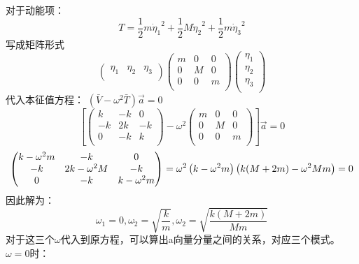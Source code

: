 \documentclass[UTF8,10pt]{article}
\begin{document}
对于动能项：
$$
    T=\frac{1}{2}{m\dot{\eta}_1}^2+\frac{1}{2}{M\dot{\eta}_2}^2+\frac{1}{2}{m\dot{\eta}_3}^2
$$
写成矩阵形式
$$
    \left( \begin{matrix}
            \eta _1 & \eta _2 & \eta _3 \\
        \end{matrix} \right) \left( \begin{matrix}
            m & 0 & 0 \\
            0 & M & 0 \\
            0 & 0 & m \\
        \end{matrix} \right) \left( \begin{array}{c}
            \eta _1 \\
            \eta _2 \\
            \eta _3 \\
        \end{array} \right)
$$
代入本征值方程：
$(\bar{V}-\omega ^2 \bar{T})\vec{a}=0$
$$
    \left[ \left( \begin{matrix}
            k  & -k & 0  \\
            -k & 2k & -k \\
            0  & -k & k  \\
        \end{matrix} \right) -\omega ^2\left( \begin{matrix}
            m & 0 & 0 \\
            0 & M & 0 \\
            0 & 0 & m \\
        \end{matrix} \right) \right] \vec{a}=0
$$
$$
    \left( \begin{matrix}
            k-\omega ^2m & -k            & 0            \\
            -k           & 2k-\omega ^2M & -k           \\
            0            & -k            & k-\omega ^2m \\
        \end{matrix} \right) =\omega ^2\left( k-\omega ^2m \right) \left( k(M+2m)-\omega^2Mm \right) =0
    \\
$$
因此解为：$$\omega_1=0,\omega_2=\sqrt{\frac{k}{m}},\omega_2=\sqrt{\frac{k(M+2m)}{Mm}}$$
对于这三个$\omega$代入到原方程，可以算出a向量分量之间的关系，对应三个模式。\\
$\omega=0$时：
\end{document}
